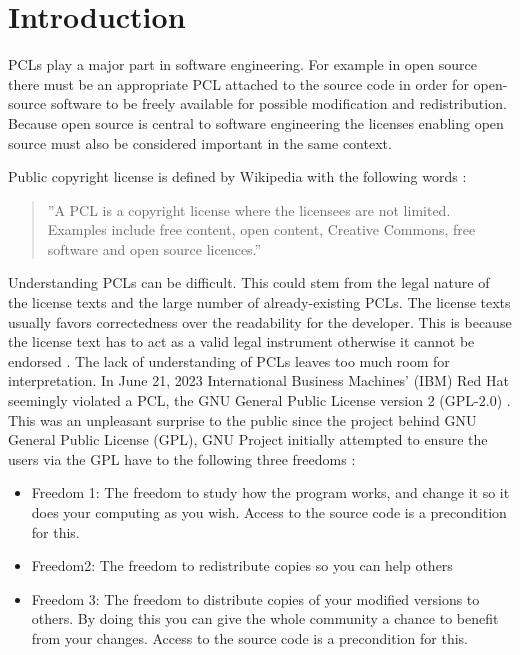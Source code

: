 \chapter{Introduction\label{intro}}

PCLs play a major part in software engineering. For example in open source there must be an appropriate PCL attached to the source code in order for open-source software to be freely available for possible modification and redistribution. Because open source is central to software engineering the licenses enabling open source must also be considered important in the same context.

Public copyright license is defined by Wikipedia with the following words \citep{wiki:publiclicenses}:
\begin{quote}
	''A PCL is a copyright license where the licensees are not limited. Examples include free content, open content, Creative Commons, free software and open source licences.''
\end{quote}

Understanding PCLs can be difficult. This could stem from the legal nature of the license texts and the large number of already-existing PCLs. The license texts usually favors correctedness over the readability for the developer. This is because the license text has to act as a valid legal instrument otherwise it cannot be endorsed \citep{ferguson2006gpl}. The lack of understanding of PCLs leaves too much room for interpretation. In June 21, 2023 International Business Machines' (IBM) Red Hat seemingly violated a PCL, the GNU General Public License version 2 (GPL-2.0) \citep{sfc:rhel} \citep{ibm:rhel}. This was an unpleasant surprise to the public since the project behind GNU General Public License (GPL), GNU Project initially attempted to ensure the users via the GPL have to the following three freedoms \citep{gnu:free}:
\begin{itemize}
	\item Freedom 1:	The freedom to study how the program works, and change it so it does your computing as you wish. Access to the source code is a precondition for this.
	\item Freedom2: The freedom to redistribute copies so you can help others
	\item Freedom 3:	The freedom to distribute copies of your modified versions to others. By doing this you can give the whole community a chance to benefit from your changes. Access to the source code is a precondition for this.
\end{itemize}

